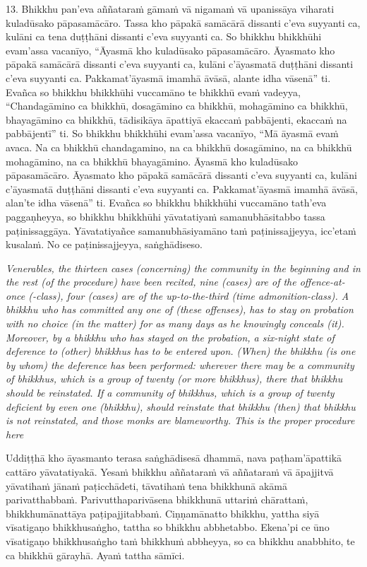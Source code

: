 \documentclass[11pt]{article}
\begin{document}
\begin{paracol}{2}
\begin{column}
\begin{flushleft}
13. Bhikkhu pan’eva aññataraṁ gāmaṁ vā nigamaṁ vā upanissāya viharati kuladūsako pāpasamācāro. Tassa kho pāpakā samācārā dissanti c’eva suyyanti ca, kulāni ca tena duṭṭhāni dissanti c’eva suyyanti ca. So bhikkhu bhikkhūhi evam’assa vacanīyo, “Āyasmā kho kuladūsako pāpasamācāro. Āyasmato kho pāpakā samācārā dissanti c’eva suyyanti ca, kulāni c’āyasmatā duṭṭhāni dissanti c’eva suyyanti ca. Pakkamat’āyasmā imamhā āvāsā, alante idha vāsenā” ti. Evañca so bhikkhu bhikkhūhi vuccamāno te bhikkhū evaṁ vadeyya, “Chandagāmino ca bhikkhū, dosagāmino ca bhikkhū, mohagāmino ca bhikkhū, bhayagāmino ca bhikkhū, tādisikāya āpattiyā ekaccaṁ pabbājenti, ekaccaṁ na pabbājentī” ti. So bhikkhu bhikkhūhi evam’assa vacanīyo, “Mā āyasmā evaṁ avaca. Na ca bhikkhū chandagamino, na ca bhikkhū dosagāmino, na ca bhikkhū mohagāmino, na ca bhikkhū bhayagāmino. Āyasmā kho kuladūsako pāpasamācāro. Āyasmato kho pāpakā samācārā dissanti c’eva suyyanti ca, kulāni c’āyasmatā duṭṭhāni dissanti c’eva suyyanti ca. Pakkamat’āyasmā imamhā āvāsā, alan’te idha vāsenā” ti. Evañca so bhikkhu bhikkhūhi vuccamāno tath’eva paggaṇheyya, so bhikkhu bhikkhūhi yāvatatiyaṁ samanubhāsitabbo tassa paṭinissaggāya. Yāvatatiyañce samanubhāsiyamāno taṁ paṭinissajjeyya, icc’etaṁ kusalaṁ. No ce paṭinissajjeyya, saṅghādiseso.
\switchcolumn*
\end{flushleft}

{\itshape\footnotesize
Venerables, the thirteen cases (concerning) the community in the beginning and in the rest (of the procedure) have been recited, nine (cases) are of the offence-at-once (-class), four (cases) are of the up-to-the-third (time admonition-class). A bhikkhu who has committed any one of (these offenses), has to stay on probation with no choice (in the matter) for as many days as he knowingly conceals (it). Moreover, by a bhikkhu who has stayed on the probation, a six-night state of deference to (other) bhikkhus has to be entered upon. (When) the bhikkhu (is one by whom) the deference has been performed: wherever there may be a community of bhikkhus, which is a group of twenty (or more bhikkhus), there that bhikkhu should be reinstated. If a community of bhikkhus, which is a group of twenty deficient by even one (bhikkhu), should reinstate that bhikkhu (then) that bhikkhu is not reinstated, and those monks are blameworthy. This is the proper procedure here
}
\switchcolumn

\begin{flushleft}
Uddiṭṭhā kho āyasmanto terasa saṅghādisesā dhammā, nava paṭham’āpattikā cattāro yāvatatiyakā. Yesaṁ bhikkhu aññataraṁ vā aññataraṁ vā āpajjitvā yāvatihaṁ jānaṁ paṭicchādeti, tāvatihaṁ tena bhikkhunā akāmā parivatthabbaṁ. Parivutthaparivāsena bhikkhunā uttariṁ chārattaṁ, bhikkhumānattāya paṭipajjitabbaṁ. Ciṇṇamānatto bhikkhu, yattha siyā vīsatigaṇo bhikkhusaṅgho, tattha so bhikkhu abbhetabbo. Ekena’pi ce ūno vīsatigaṇo bhikkhusaṅgho taṁ bhikkhuṁ abbheyya, so ca bhikkhu anabbhito, te ca bhikkhū gārayhā. Ayaṁ tattha sāmīci.
\switchcolumn*
\end{flushleft}


\end{column}
\end{paracol}
\end{document}
